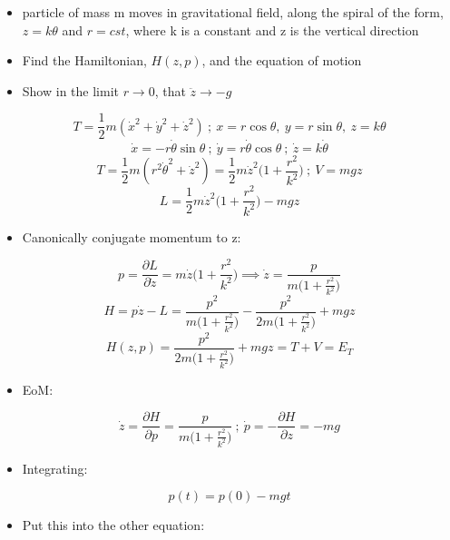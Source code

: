 \documentclass[a4paper,11pt,normalem]{article}
\begin{document}
\begin{example}[2]

\begin{itemize}
\item
  particle of mass m moves in gravitational field, along the spiral of
  the form, \(z = k\theta\) and \(r = cst\), where k is a constant and z
  is the vertical direction
\item
  Find the Hamiltonian, \(H(z, p)\), and the equation of motion
\item
  Show in the limit \(r \to 0\), that \(\ddot{z} \to -g\)
\end{itemize}

\[
    T = \frac{1}{2}m(\dot{x}^2 + \dot{y}^2 + \dot{z}^2) ~;~ x = r\cos\theta,~ y = r\sin\theta,~ z = k\theta \]
\[
    \dot{x} = -r\dot{\theta}\sin\theta ~;~ \dot{y} = r\dot{\theta}\cos\theta ~;~ \dot{z} = k\dot{\theta} \]
\[
    T = \frac{1}{2}m (r^2\dot{\theta}^2 + \dot{z}^2) = \frac{1}{2}m\dot{z}^2 \Big(1 + \frac{r^2}{k^2}\Big) ~;~ V = mgz \]
\[
    L = \frac{1}{2}m\dot{z}^2 \Big(1 + \frac{r^2}{k^2}\Big) - mgz
\]

\begin{itemize}
\item
  Canonically conjugate momentum to z:
\end{itemize}

\[
    p = \frac{\partial L}{\partial \dot{z}} = m\dot{z}\Big(1 + \frac{r^2}{k^2}\Big) \implies \dot{z} = \frac{p}{m\big(1 + \tfrac{r^2}{k^2}\big)} \]
\[
    H = p\dot{z} - L = \frac{p^2}{m\big(1 + \tfrac{r^2}{k^2}\big)} - \frac{p^2}{2m\big(1 + \tfrac{r^2}{k^2}\big)} + mgz \]
\[
    H(z, p) = \frac{p^2}{2m\big(1 + \tfrac{r^2}{k^2}\big)} + mgz = T + V = E_T
\]

\begin{itemize}
\item
  EoM:
\end{itemize}

\[
    \dot{z} = \frac{\partial H}{\partial p} = \frac{p}{m\big(1 + \tfrac{r^2}{k^2}\big)} ~;~ \dot{p} = -\frac{\partial H}{\partial z} = -mg
\]

\begin{itemize}
\item
  Integrating:
\end{itemize}

\[
    p(t) = p(0) - mgt
\]

\begin{itemize}
\item
  Put this into the other equation:
\end{itemize}


\end{example}
\end{document}
